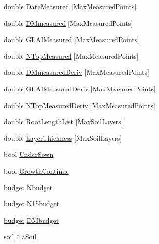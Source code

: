 \begin{DoxyCompactItemize}
\item 
double \hyperlink{classcrop_abc773778bea26210ad38d1ed7a342e24}{DateMeasured} \mbox{[}MaxMeasuredPoints\mbox{]}
\item 
double \hyperlink{classcrop_ab89c9b8db9ad838549d4072dceeb2687}{DMmeasured} \mbox{[}MaxMeasuredPoints\mbox{]}
\item 
double \hyperlink{classcrop_ad4423586042c12afedbec52624d26fe1}{GLAIMeasured} \mbox{[}MaxMeasuredPoints\mbox{]}
\item 
double \hyperlink{classcrop_a1c9dc2dc8243ccdccb109ad9b578024b}{NTopMeasured} \mbox{[}MaxMeasuredPoints\mbox{]}
\item 
double \hyperlink{classcrop_aec9af11e7b2b4fef9fe6c3b5bc892fa4}{DMmeasuredDeriv} \mbox{[}MaxMeasuredPoints\mbox{]}
\item 
double \hyperlink{classcrop_a6bbccaab0f3df96f277d5891a27176b6}{GLAIMeasuredDeriv} \mbox{[}MaxMeasuredPoints\mbox{]}
\item 
double \hyperlink{classcrop_ab47524d5cde79d0ad709a7e13524dac5}{NTopMeasuredDeriv} \mbox{[}MaxMeasuredPoints\mbox{]}
\item 
double \hyperlink{classcrop_ad629acdfd462323490f91ad3ce9a7b59}{RootLengthList} \mbox{[}MaxSoilLayers\mbox{]}
\item 
double \hyperlink{classcrop_a26eb467869df5fc16784e0b42798cc4b}{LayerThickness} \mbox{[}MaxSoilLayers\mbox{]}
\item 
bool \hyperlink{classcrop_a6af7b95c4e451b425aeed60156151e9d}{UnderSown}
\item 
bool \hyperlink{classcrop_af82f3b3de55473a22e08c2b07d6e0645}{GrowthContinue}
\item 
\hyperlink{classbudget}{budget} \hyperlink{classcrop_af7ae14fac12af3efa728e789155983fb}{Nbudget}
\item 
\hyperlink{classbudget}{budget} \hyperlink{classcrop_a3e5fad944be35152e933b5e50f928f5a}{N15budget}
\item 
\hyperlink{classbudget}{budget} \hyperlink{classcrop_a46844fd0540eb7627555f21afa8545e8}{DMbudget}
\item 
\hyperlink{classsoil}{soil} $\ast$ \hyperlink{classcrop_aaf7bdd66e714b1ad4057bad5a46e6772}{aSoil}
\end{DoxyCompactItemize}


